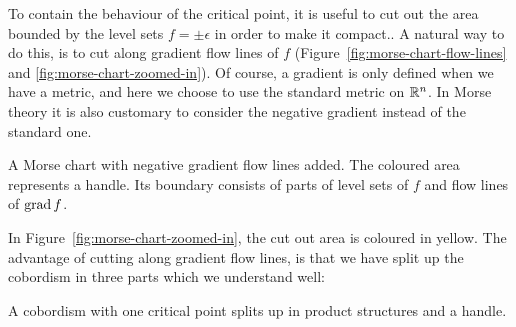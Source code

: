 To contain the behaviour of the critical point, it is useful to cut out the area bounded by the level sets $f = \pm \epsilon$ in order to make it compact..
A natural way to do this, is to cut along gradient flow lines of $f$ (Figure~\ref{fig:morse-chart-flow-lines} and \ref{fig:morse-chart-zoomed-in}).
Of course, a gradient is only defined when we have a metric, and here we choose to use the standard metric on $\mathbb{R}^{n}$. In Morse theory it is also customary to consider the negative gradient instead of the standard one.
\begin{marginfigure}
    \centering
    \caption{A Morse chart with negative gradient flow lines added.
    The coloured area represents a handle. Its boundary consists of parts of level sets of $f$ and flow lines of $\operatorname{grad} f$.}
    \label{fig:morse-chart-flow-lines}
\end{marginfigure}
In Figure~\ref{fig:morse-chart-zoomed-in}, the cut out area is coloured in yellow.
The advantage of cutting along gradient flow lines, is that we have split up the cobordism in three parts which we understand well:
\begin{marginfigure}
    \centering
    \caption{A cobordism with one critical point splits up in product structures and a handle.}
    \label{fig:morse-chart-zoomed-in}
\end{marginfigure}
